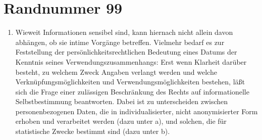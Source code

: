     \section{Randnummer 99}
    \begin{enumerate}[label=\arabic*,start=99]
        \item Wieweit Informationen sensibel sind, kann hiernach nicht allein davon abhängen, ob sie intime Vorgänge betreffen. Vielmehr bedarf es zur Feststellung der persönlichkeitsrechtlichen Bedeutung eines Datums der Kenntnis seines Verwendungszusammenhangs: Erst wenn Klarheit darüber besteht, zu welchem Zweck Angaben verlangt werden und welche Verknüpfungsmöglichkeiten und Verwendungsmöglichkeiten bestehen, läßt sich die Frage einer zulässigen Beschränkung des Rechts auf informationelle Selbstbestimmung beantworten. Dabei ist zu unterscheiden zwischen personenbezogenen Daten, die in individualisierter, nicht anonymisierter Form erhoben und verarbeitet werden (dazu unter a), und solchen, die für statistische Zwecke bestimmt sind (dazu unter b).
    \end{enumerate}
        

